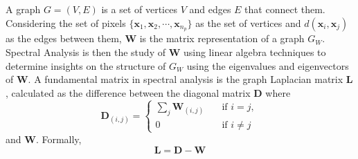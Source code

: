 A graph $G = (V,E)$ is a set of vertices $V$ and edges $E$ that connect them. Considering the set of pixels $\{\mathbf{x}_1, \mathbf{x}_2 , \cdots , \mathbf{x}_{n_p} \}$ as the set of vertices and $d(\mathbf{x}_i, \mathbf{x}_j)$ as the edges between them, $\mathbf{W}$ is the matrix representation of a graph $G_W$. Spectral Analysis is then the study of $\mathbf{W}$ using linear algebra techniques to determine insights on the structure of $G_W$ using the eigenvalues and eigenvectors of $\mathbf{W}$. A fundamental matrix in spectral analysis is the graph Laplacian matrix $\mathbf{L}$, calculated as the difference between the diagonal matrix $\mathbf{D}$ where
\begin{equation}
    \label{sc:d-mtx}
    \mathbf{D}_{(i,j)} = \begin{cases}
        \sum _{j}\mathbf{W}_{(i,j)} &\quad \text{if } i = j,\\
        0 & \quad \text{if } i \neq j
    \end{cases}
\end{equation}
and $\mathbf{W}$. Formally,
\begin{equation}
    \label{sc:laplacian-mtx}
    \mathbf{L} = \mathbf{D} - \mathbf{W}
\end{equation}
